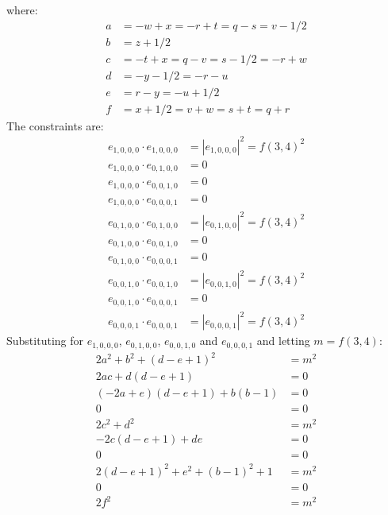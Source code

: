 \documentclass[12pt,titlepage]{article}
\numberwithin{equation}{section}
\begin{document}
where:
\begin{align*}
a &= -w+x   = -r+t   = q-s   =  v-1/2 \\
b &=  z+1/2                           \\
c &= -t+x   =  q-v   = s-1/2 = -r+w   \\
d &= -y-1/2 = -r-u                    \\
e &=  r-y   = -u+1/2                  \\
f &=  x+1/2 =  v+w   = s+t   =  q+r
\end{align*}
The constraints are:
\begin{align*}
e_{1,0,0,0} \cdot e_{1,0,0,0} &= |e_{1,0,0,0}|^2 = f(3,4)^2 \\
e_{1,0,0,0} \cdot e_{0,1,0,0} &= 0                          \\
e_{1,0,0,0} \cdot e_{0,0,1,0} &= 0                          \\
e_{1,0,0,0} \cdot e_{0,0,0,1} &= 0                          \\
e_{0,1,0,0} \cdot e_{0,1,0,0} &= |e_{0,1,0,0}|^2 = f(3,4)^2 \\
e_{0,1,0,0} \cdot e_{0,0,1,0} &= 0                          \\
e_{0,1,0,0} \cdot e_{0,0,0,1} &= 0                          \\
e_{0,0,1,0} \cdot e_{0,0,1,0} &= |e_{0,0,1,0}|^2 = f(3,4)^2 \\
e_{0,0,1,0} \cdot e_{0,0,0,1} &= 0                          \\
e_{0,0,0,1} \cdot e_{0,0,0,1} &= |e_{0,0,0,1}|^2 = f(3,4)^2
\end{align*}
Substituting for $e_{1,0,0,0}$, $e_{0,1,0,0}$, $e_{0,0,1,0}$ and
$e_{0,0,0,1}$ and letting $m = f(3,4)$:
\begin{align}
2a^2 + b^2 + (d-e+1)^2         &= m^2 \label{con45:1} \\
2ac + d(d-e+1)                 &= 0   \label{con45:2} \\
(-2a+e)(d-e+1) + b(b-1)        &= 0   \label{con45:3} \\
0                              &= 0   \nonumber       \\
2c^2 + d^2                     &= m^2 \label{con45:4} \\
-2c(d-e+1) + de                &= 0   \label{con45:5} \\
0                              &= 0   \nonumber       \\
2(d-e+1)^2 + e^2 + (b-1)^2 + 1 &= m^2 \label{con45:6} \\
0                              &= 0   \nonumber       \\
2f^2                           &= m^2 \label{con45:7}
\end{align}
\end{document}
